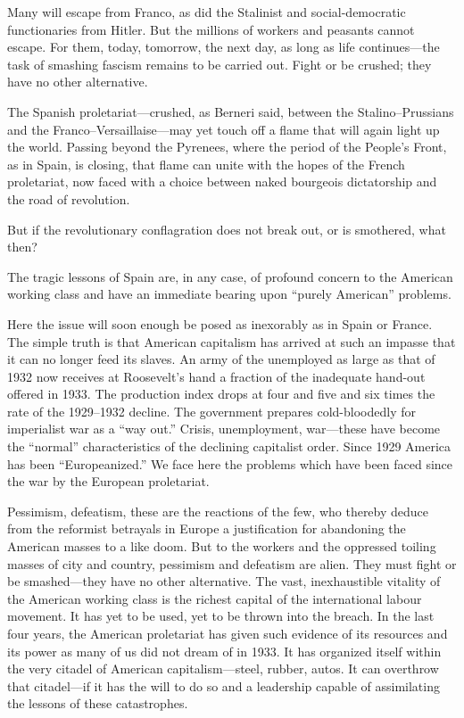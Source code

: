 Many will escape from Franco, as did the Stalinist and social-democratic functionaries from Hitler. But the millions of workers and peasants cannot escape. For them, today, tomorrow, the next day, as long as life continues---the task of smashing fascism remains to be carried out. Fight or be crushed; they have no other alternative.

The Spanish proletariat---crushed, as Berneri said, between the Stalino--Prussians and the Franco--Versaillaise---may yet touch off a flame that will again light up the world. Passing beyond the Pyrenees, where the period of the People’s Front, as in Spain, is closing, that flame can unite with the hopes of the French proletariat, now faced with a choice between naked bourgeois dictatorship and the road of revolution.

But if the revolutionary conflagration does not break out, or is smothered, what then?

The tragic lessons of Spain are, in any case, of profound concern to the American working class and have an immediate bearing upon ``purely American'' problems.

Here the issue will soon enough be posed as inexorably as in Spain or France. The simple truth is that American capitalism has arrived at such an impasse that it can no longer feed its slaves. An army of the unemployed as large as that of 1932 now receives at Roosevelt’s hand a fraction of the inadequate hand-out offered in 1933. The production index drops at four and five and six times the rate of the 1929--1932 decline. The government prepares cold-bloodedly for imperialist war as a ``way out.'' Crisis, unemployment, war---these have become the ``normal'' characteristics of the declining capitalist order. Since 1929 America has been ``Europeanized.'' We face here the problems which have been faced since the war by the European proletariat.

Pessimism, defeatism, these are the reactions of the few, who thereby deduce from the reformist betrayals in Europe a justification for abandoning the American masses to a like doom. But to the workers and the oppressed toiling masses of city and country, pessimism and defeatism are alien. They must fight or be smashed---they have no other alternative. The vast, inexhaustible vitality of the American working class is the richest capital of the international labour movement. It has yet to be used, yet to be thrown into the breach. In the last four years, the American proletariat has given such evidence of its resources and its power as many of us did not dream of in 1933. It has organized itself within the very citadel of American capitalism---steel, rubber, autos. It can overthrow that citadel---if it has the will to do so and a leadership capable of assimilating the lessons of these catastrophes.

